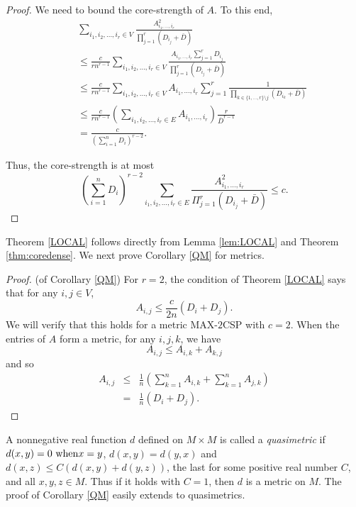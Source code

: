 \documentclass{book}
\numberwithin{exercise}{chapter}
\begin{document}
\begin{proof}
We need to bound the core-strength of $A$. To this end,
\begin{eqnarray*}
&&\sum_{i_1, i_2, \ldots, i_r \in V}
\frac{A_{i_1,\ldots,i_r}^2}{\prod_{j=1}^r (D_{i_j}+\bar{D})} \\
&&\le
\frac{c}{rn^{r-1}}\sum_{i_1, i_2, \ldots, i_r \in V}
\frac{A_{i_1,\ldots,i_r} \sum_{j=1}^r D_{i_j}}{\prod_{j=1}^r (D_{i_j}+\bar{D})}\\
&&\le \frac{c}{rn^{r-1}}\sum_{i_1, i_2, \ldots, i_r \in V}
A_{i_1,\ldots,i_r} \sum_{j=1}^r \frac{1}{\prod_{k \in \{1,\ldots,r\}\setminus j} (D_{i_k}+\bar{D})}\\
&&\le \frac{c}{rn^{r-1}}\left(\sum_{i_1, i_2, \ldots, i_r \in E}
A_{i_1,\ldots,i_r}\right)\frac{r}{\bar{D}^{r-1}}\\
&&= \frac{c}{(\sum_{i=1}^n D_i)^{r-2}}.
\end{eqnarray*}

Thus, the core-strength is at most
\[
(\sum_{i=1}^n D_i)^{r-2}\sum_{i_1, i_2, \ldots, i_r \in E}
\frac{A_{i_1,\ldots,i_r}^2}{\Pi_{j=1}^r (D_{i_j}+\bar{D})} \leq c.
\]
\end{proof}

Theorem \ref{LOCAL} follows directly from Lemma \ref{lem:LOCAL} and
Theorem \ref{thm:coredense}. We next prove Corollary \ref{QM} for metrics.

\begin{proof}(of Corollary \ref{QM})
For $r=2$, the condition of Theorem \ref{LOCAL} says that for any $i,j \in V$,
\[
A_{i,j} \leq \frac{c}{2n} (D_i+D_j).
\]
We will verify that this holds for a metric MAX-$2$CSP with $c=2$.
When the entries of $A$ form a metric, for any $i,j,k$, we have
\[
A_{i,j} \leq A_{i,k} + A_{k,j}
\]
and so
\begin{eqnarray*}
A_{i,j} &\leq& \frac{1}{n} \left(\sum_{k=1}^n A_{i,k}+ \sum_{k=1}^n A_{j,k}\right)\\
&=& \frac{1}{n} (D_i+D_j).
\end{eqnarray*}
\end{proof}

A nonnegative real function $d$ defined on $M \times M$ is called a \textit{quasimetric}
if
  $d(x,y)  =  0~ {\rm when} x=y$, $ d(x,y)  =  d(y,x)$ and
$d(x,z) \le C(d(x,y)+d(y,z))$,
the last for some positive real number $C$, and all $x,y,z \in M$.
Thus if it holds with $C=1$, then $d$
is a metric on $M$. The proof of Corollary \ref{QM} easily extends
to quasimetrics.
\end{document}
